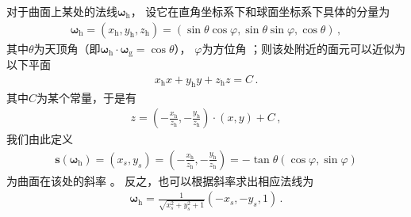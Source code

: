 对于曲面上某处的法线${\bm\omega}_{\mathrm{h}}$，
设它在直角坐标系下和球面坐标系下具体的分量为
\begin{align}
    {\bm\omega}_{\mathrm{h}}=(x_{\mathrm{h}},y_{\mathrm{h}},z_{\mathrm{h}})
    =(\sin\theta\cos\varphi,\sin\theta\sin\varphi,\cos\theta)\, ,
\end{align}
其中$\theta$为天顶角（即${\bm\omega}_{\mathrm{h}}\cdot{\bm\omega}_{\mathrm{g}}=\cos\theta$），
$\varphi$为方位角
；则该处附近的面元可以近似为以下平面
\begin{align}
    x_{\mathrm{h}}x+y_{\mathrm{h}}y+z_{\mathrm{h}}z=C\, .
\end{align}
其中$C$为某个常量，于是有
\begin{align}
    z=\left(-\frac{x_{\mathrm{h}}}{z_{\mathrm{h}}},
    -\frac{y_{\mathrm{h}}}{z_{\mathrm{h}}}\right)\cdot(x,y)+C\, ,
\end{align}
我们由此定义
\begin{align}
    {\bm s}({\bm\omega}_{\mathrm{h}})=(x_s,y_s)
    =\left(-\frac{x_{\mathrm{h}}}{z_{\mathrm{h}}},
    -\frac{y_{\mathrm{h}}}{z_{\mathrm{h}}}\right)
    =-\tan\theta(\cos\varphi,\sin\varphi)
\end{align}
为曲面在该处的斜率
。
反之，也可以根据斜率求出相应法线为
\begin{align}\label{eq:08-ex01-normals-by-slope}
    {\bm\omega}_{\mathrm{h}}=\frac{1}{\sqrt{x_s^2+y_s^2+1}}(-x_s,-y_s,1)\, .
\end{align}

